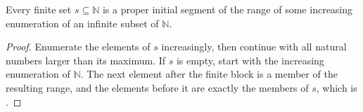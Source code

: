\begin{lemma}
Every finite set $s\subseteq\mathbb N$ is a proper initial segment of the
range of some increasing enumeration of an infinite subset of $\mathbb N$.
\end{lemma}
\begin{proof}
Enumerate the elements of $s$ increasingly, then continue with all natural
numbers larger than its maximum.  If $s$ is empty, start with the increasing
enumeration of $\mathbb N$.  The next element after the finite block is a
member of the resulting range, and the elements before it are exactly the
members of $s$, which is .
\end{proof}

